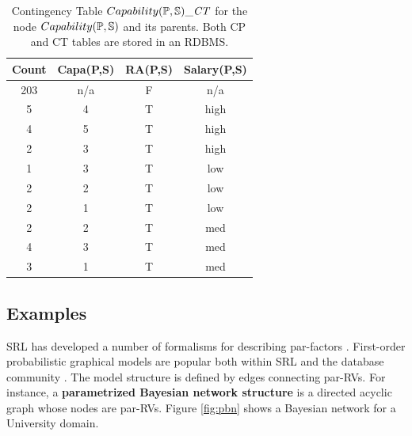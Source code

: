 \begin{table}[htbp]
  \centering
  \caption{Contingency Table $Capability(\P,\S)\_\cttable$ for the node $Capability(\P,\S)$ and its parents. Both CP and CT tables are stored in an RDBMS.}
    \begin{tabular}{|c|c|c|c|} \hline
    \textbf{Count} & \textbf{Capa(P,S)} & \textbf{RA(P,S)} & \textbf{Salary(P,S) } \\ \hline
    203   & n/a   & F     & n/a \\ \hline
    5     & 4     & T     & high \\ \hline
    4     & 5     & T     & high \\ \hline
    2     & 3     & T     & high \\ \hline
    1     & 3     & T     & low \\ \hline
    2     & 2     & T     & low \\\hline
    2     & 1     & T     & low \\ \hline
    2     & 2     & T     & med \\ \hline
    4     & 3     & T     & med \\ \hline
    3     & 1     & T     & med \\ \hline
    \end{tabular}%
  \label{tab:pbn-ct}%
\end{table}%



\subsection{Examples} \label{sec:examples} SRL has developed a number of formalisms for describing par-factors \cite{Kimmig2015}. 
First-order probabilistic graphical models
are popular both within SRL and the database community \cite{Kimmig2015,Wang2008}. The model structure is defined by edges connecting par-RVs. For instance, a \textbf{parametrized Bayesian network structure} is a directed acyclic graph whose nodes are par-RVs.  Figure \ref{fig:pbn} shows a Bayesian network for a University domain. 

